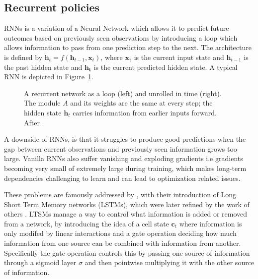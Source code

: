 \subsection{Recurrent policies}
\label{sec:recurrent}
RNNs is a variation of a Neural Network which allows it to predict future outcomes based on previously seen observations by introducing a loop which allows information to pass from one prediction step to the next. The architecture is defined by $\mathbf{h}_t = f(\mathbf{h}_{t-1}, \mathbf{x}_t)$, where $\mathbf{x_t}$ is the current input state and $\mathbf{h}_{t-1}$ is the past hidden state and $\mathbf{h_t}$ is the current predicted hidden state. A typical RNN is depicted in Figure~\ref{fig:rnn}.

\begin{figure}[htbp]
    \centering
    \def\rnnunrolled{full}
    
    \caption{A recurrent network as a loop (left) and unrolled in time (right). The module $A$ and its weights are the same at every step; the hidden state $\mathbf{h}_t$ carries information from earlier inputs forward. After \textcite{olah2015lstm}.}
    \label{fig:rnn}
\end{figure}

A downside of RNNs, is that it struggles to produce good predictions when the gap between current observations and previously seen information grows too large. Vanilla RNNs also suffer vanishing and exploding gradients i.e gradients becoming very small of extremely large during training, which makes long-term dependencies challenging to learn and can lead to optimization related issues.

These problems are famously addressed by \textcite{hochreiter1997long}, with their introduction of Long Short Term Memory networks (LSTMs), which were later refined by the work of others \parencite{olah2015lstm}. LTSMs manage a way to control what information is added or removed from a network, by introducing the idea of a cell state $\mathbf{c}_t$ where information is only modifed by linear interactions and a gate operation deciding how much information from one source can be combined with information from another. Specifically the gate operation controls this by passing one source of information through a sigmoid layer $\sigma$ and then pointwise multiplying it with the other source of information.

